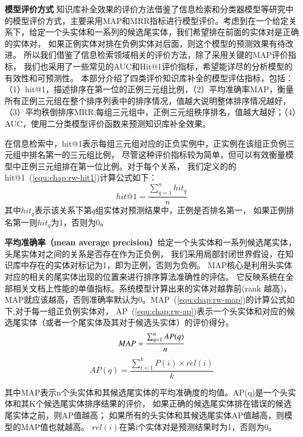 \textbf{模型评价方式} 知识库补全效果的评价方法借鉴了信息检索和分类器模型等研究中的模型评价方式，主要采用MAP和MRR\cite{Gardner2014}指标进行模型评价。考虑到在一个给定关系下，给定一个头实体和一系列的候选尾实体，我们希望排在前面的实体对是正确的实体对，
如果正例实体对排在负例实体对后面，则这个模型的预测效果有待改进。
所以我们借鉴了信息检索领域相关的评价方法，除了采用关键的MAP评价指标，
我们也采用了一些常见的AUC和Hit@1评价指标，希望能详尽的分析模型的有效性和可预测性。
本部分介绍了四类评价知识库补全的模型评估指标，包括：（1）hit@1，描述排序在第一位的正例三元组比例，（2）平均准确率MAP，衡量所有正例三元组在整个排序列表中的排序情况，值越大说明整体排序情况越好，（3）平均秩倒排序MRR,每组三元组中，正例三元组秩序排名，值越大越好；（4）AUC，使用二分类模型评价函数来预测知识库补全效果。

在信息检索中，hit@1表示每组三元组对应的正负实例中，正实例在该组正负例三元组中排名第一的三元组比例，
尽管这种评价指标较为简单，但可以有效衡量模型中正例三元组排在第一位比例。对于每个关系，
我们定义的的hit@1~(\ref{equ:chap:rw-hit1})计算公式如下：
\begin{equation}
\label{equ:chap:rw-hit1}
hit@1=\frac{\sum_{q=1}^n{hit_q}}{n}
\end{equation}
其中$hit_q$表示该关系下第$q$组实体对预测结果中，正例是否排名第一，
如果正例排名第一则$hit_q$为1，否则为0。

\textbf{平均准确率（mean average precision）}给定一个头实体和一系列候选尾实体，头尾实体对之间的关系是否存在作为正负例，
我们采用局部封闭世界假设，在知识库中存在的实体对标记为1，即为正例，否则为负例。
MAP核心是利用头实体对应的相关的尾实体出现的位置来进行排序算法准确性的评估。
它反映系统在全部相关文档上性能的单值指标。系统模型计算出来的实体对越靠前(rank 越高)，MAP就应该越高，否则准确率默认为0。MAP~(\ref{equ:chap:rw-map})的计算公式如下,对于每一组正负例实体对，
AP~(\ref{equ:chap:rw-ap})表示一个头实体和对应的候选尾实体（或者一个尾实体及其对于候选头实体）的评价得分。
\begin{equation}
\label{equ:chap:rw-map}
MAP=\frac{\sum_{q=1}^nAP(q)}{n} \\
\end{equation}
\begin{equation}
\label{equ:chap:rw-ap}
AP(q)=\frac{\sum_{i=1}^kP(i)\times rel(i)}{k}
\end{equation}

其中MAP表示n个头实体和其候选尾实体的平均准确度的均值。AP(q)是一个头实体和其K个候选尾实体排序结果的评价，
如果正确的候选尾实体排在错误的候选尾实体之前，则AP值越高；
如果所有的头实体和其候选尾实体AP值越高，则模型的MAP值也就越高。
$rel(i)$在第i个实体对是预测结果时为1，否则为0。


